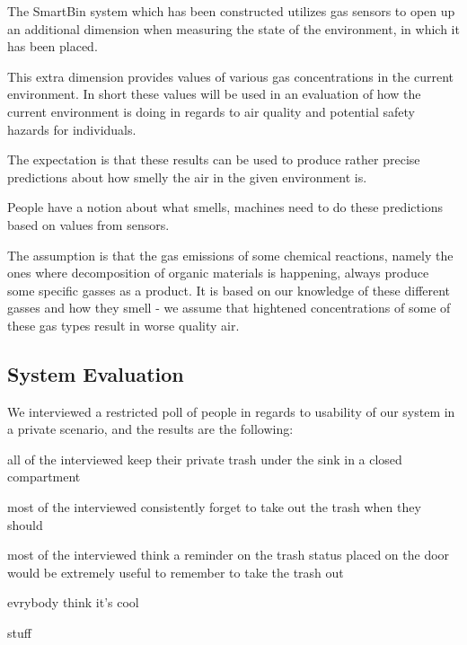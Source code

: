 The SmartBin system which has been constructed utilizes gas sensors to open up an additional dimension when measuring the state of the environment, in which it has been placed.

This extra dimension provides values of various gas concentrations in the current environment.
In short these values will be used in an evaluation of how the current environment is doing in regards to air quality and potential safety hazards for individuals.

The expectation is that these results can be used to produce rather precise predictions about how smelly the air in the given environment is.

People have a notion about what smells, machines need to do these predictions based on values from sensors.

The assumption is that the gas emissions of some chemical reactions, namely the ones where decomposition of organic materials is happening, always produce some specific gasses as a product.
It is based on our knowledge of these different gasses and how they smell - we assume that hightened concentrations of some of these gas types result in worse quality air.


\subsection{System Evaluation}

We interviewed a restricted poll of people in regards to usability of our system in a private scenario, and the results are the following:

all of the interviewed keep their private trash under the sink in a closed compartment

most of the interviewed consistently forget to take out the trash when they should

most of the interviewed think a reminder on the trash status placed on the door would be extremely useful to remember to take the trash out

evrybody think it's cool

stuff
